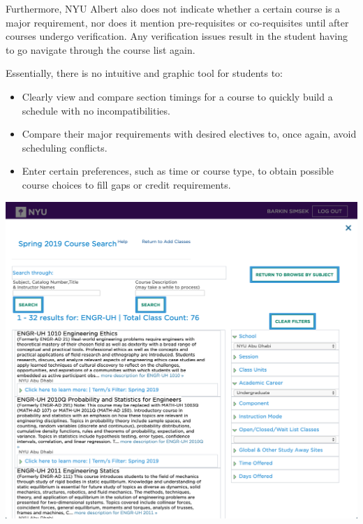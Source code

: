 \documentclass[a4paper, 11.5 pt, conference]{ieeeconf}  %
\begin{document}
\noindent Furthermore, NYU Albert also does not indicate whether a certain course is a major requirement, nor does it mention pre-requisites or co-requisites until after courses undergo verification.  Any verification issues result in the student having to go navigate through the course list again. 

Essentially, there is no intuitive and graphic tool for students to:
\begin{itemize}

\item Clearly view and compare section timings for a course to quickly build a schedule with no incompatibilities.
\item Compare their major requirements with desired electives to, once again, avoid scheduling conflicts.

\item Enter certain preferences, such as time or course type, to obtain possible course choices to fill gaps or credit requirements.
\end{itemize}

\begingroup
    \medskip
    \centering
    \includegraphics[width=\columnwidth]{images/6.png}
    \label{fig:first}
    \medskip
\endgroup
\end{document}
